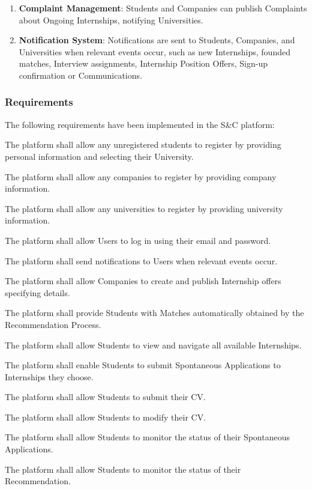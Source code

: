 \begin{enumerate}
    \item \textbf{\color{titleColor}Complaint Management}: Students and Companies can publish Complaints about Ongoing Internships, notifying Universities.
    \item \textbf{\color{titleColor}Notification System}: Notifications are sent to Students, Companies, and Universities when relevant events occur, such as new Internships, founded matches, Interview assignments,  Internship Position Offers, Sign-up confirmation or Communications.
\end{enumerate}
\subsubsection{Requirements}
The following requirements have been implemented in the S\&C platform:
\begin{enumerate}[label={\color{titleColor}[R\arabic*]}]
    \item The platform shall allow any unregistered students to register by providing personal information and selecting their University.
    \item The platform shall allow any companies to register by providing company information.
    \item The platform shall allow any universities to register by providing university information.
    \item The platform shall allow Users to log in using their email and password.
    \item The platform shall send notifications to Users when relevant events occur.
    
    \item The platform shall allow Companies to create and publish Internship offers specifying details.
    \setcounter{enumi}{7}
    \item The platform shall provide Students with Matches automatically obtained by the Recommendation Process.
    \item The platform shall allow Students to view and navigate all available Internships.
    \item The platform shall enable Students to submit Spontaneous Applications to Internships they choose.
    \item The platform shall allow Students to submit their CV.
    \item The platform shall allow Students to modify their CV.
    \item The platform shall allow Students to monitor the status of their Spontaneous Applications.
    \item The platform shall allow Students to monitor the status of their Recommendation.
    

\end{enumerate}
